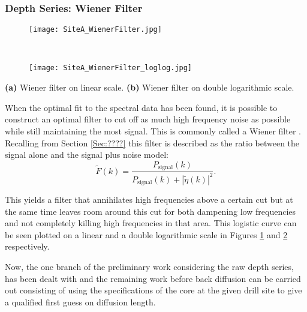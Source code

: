 \documentclass[../../CompleteThesis/Complete_1stDraft.tex]{subfiles}
\begin{document}
\subsubsection[Wiener Filter]{Depth Series: Wiener Filter}
\label{Subsubsec:Method_FirstSigmaEstimate_BackDiffusion_WienerFilter}

\begin{marginfigure}
	\centering
	\begin{subfigure}{\marginparwidth}
		\centering
		\texttt{[image: SiteA\_WienerFilter.jpg]}
		\caption{\footnotesize}
		\label{fig:SiteA_WienerFilter}
	\end{subfigure}\\[1ex]
	
	\begin{subfigure}{\marginparwidth}
		\centering
		\texttt{[image: SiteA\_WienerFilter\_loglog.jpg]}
		\caption{\footnotesize}
		\label{fig:SiteA_WienerFilter_loglog}
	\end{subfigure}
	\caption[Wiener filter]{\footnotesize\textbf{(a)} Wiener filter on linear scale. \textbf{(b)} Wiener filter on double logarithmic scale.}
	\label{fig:SiteA_WienerFilters}
\end{marginfigure}
When the optimal fit to the spectral data has been found, it is possible to construct an optimal filter to cut off as much high frequency noise as possible while still maintaining the most signal. This is commonly called a Wiener filter . Recalling from Section \ref{Sec:????} this filter is described as the ratio between the signal alone and the signal plus noise model:
\begin{equation}
	\tilde{F}(k) = \frac{P_{\text{signal}}(k)}{P_{\text{signal}}(k) + |\tilde{\eta}(k)|^2}.
	\label{Eq:MethodWienerFilter}
\end{equation}

This yields a filter that annihilates high frequencies above a certain cut but at the same time leaves room around this cut for both dampening low frequencies and not completely killing high frequencies  in that area. 
This logistic curve can be seen plotted on a linear and a double logarithmic scale in Figures \ref{fig:SiteA_WienerFilter} and \ref{fig:SiteA_WienerFilter_loglog} respectively.

Now, the one branch of the preliminary work considering the raw depth series, has been dealt with and the remaining work before back diffusion can be carried out consisting of using the specifications of the core at the given drill site to give a qualified first guess on diffusion length.
\end{document}
